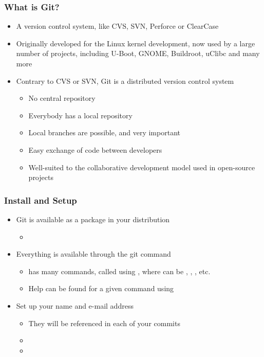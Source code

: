 \begin{frame}
  \frametitle{What is Git?}
  \begin{itemize}
  \item A version control system, like CVS, SVN, Perforce or ClearCase
  \item Originally developed for the Linux kernel development, now
    used by a large number of projects, including U-Boot, GNOME,
    Buildroot, uClibc and many more
  \item Contrary to CVS or SVN, Git is a distributed version control
    system
    \begin{itemize}
    \item No central repository
    \item Everybody has a local repository
    \item Local branches are possible, and very important
    \item Easy exchange of code between developers
    \item Well-suited to the collaborative development model used in
      open-source projects
    \end{itemize}
  \end{itemize}
\end{frame}

\begin{frame}
  \frametitle{Install and Setup}
  \begin{itemize}
  \item Git is available as a package in your distribution
    \begin{itemize}
    \item {}
    \end{itemize}
  \item Everything is available through the git command
    \begin{itemize}
    \item {} has many commands, called using
      , where  can be
      , , , etc.
    \item Help can be found for a given command using
    \end{itemize}
  \item Set up your name and e-mail address
    \begin{itemize}
    \item They will be referenced in each of your commits
    \item {}
    \item {}
    \end{itemize}
  \end{itemize}
\end{frame}

